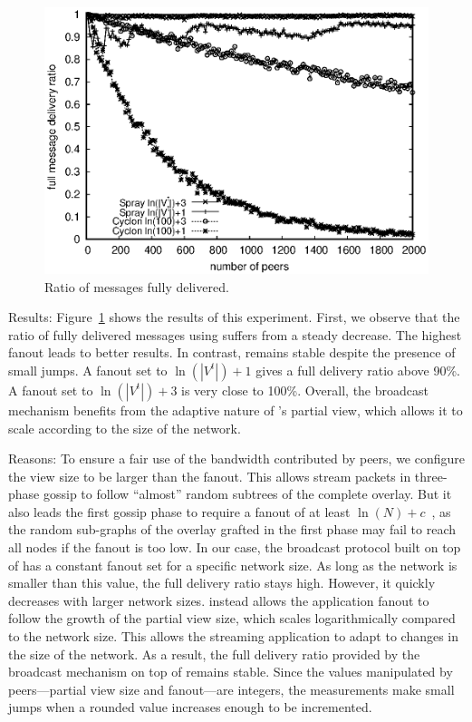 \begin{asparadesc}
\begin{figure}
  \begin{center}
    \includegraphics[width=\SCALE\textwidth]{img/hardrate.eps}
    \caption{\label{fig:hardrate}Ratio of messages fully delivered.}
  \end{center}
\end{figure}

\item [Results:] Figure~\ref{fig:hardrate} shows the results of this
  experiment. First, we observe that the ratio of fully delivered
  messages using \CYCLON suffers from a steady decrease. The highest
  fanout leads to better results. In contrast, \SPRAY remains stable
  despite the presence of small jumps. A fanout set to $\ln(|V^t|)+1$
  gives a full delivery ratio above 90\%. A fanout set to
  $\ln(|V^t|)+3$ is very close to 100\%. Overall, the broadcast
  mechanism benefits from the adaptive nature of \SPRAY's partial
  view, which allows it to scale according to the size of the network.
\item [Reasons:] To ensure a fair use of the bandwidth contributed by
  peers, we configure the view size to be larger than the fanout. This
  allows stream packets in three-phase gossip to follow ``almost''
  random subtrees of the complete overlay. But it also leads the first
  gossip phase to require a fanout of at least $\ln(N)+c$~\cite{PRD},
  as the random sub-graphs of the overlay grafted in the first phase
  may fail to reach all nodes if the fanout is too low. In our case,
  the broadcast protocol built on top of \CYCLON has a constant fanout
  set for a specific network size. As long as the network is smaller
  than this value, the full delivery ratio stays high. However, it
  quickly decreases with larger network sizes.  \SPRAY instead allows
  the application fanout to follow the growth of the partial view
  size, which scales logarithmically compared to the network
  size. This allows the streaming application to adapt to changes in
  the size of the network. As a result, the full delivery ratio
  provided by the broadcast mechanism on top of \SPRAY remains
  stable. Since the values manipulated by peers---partial view size
  and fanout---are integers, the measurements make small jumps when a
  rounded value increases enough to be incremented.
\end{asparadesc}


